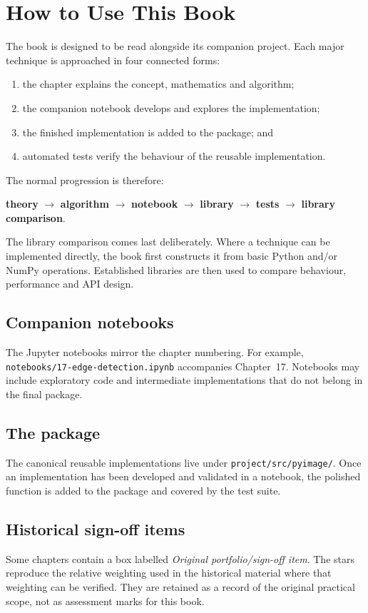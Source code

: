 \chapter*{How to Use This Book}

The book is designed to be read alongside its companion project. Each major
technique is approached in four connected forms:

\begin{enumerate}
    \item the chapter explains the concept, mathematics and algorithm;
    \item the companion notebook develops and explores the implementation;
    \item the finished implementation is added to the \pyimage{} package; and
    \item automated tests verify the behaviour of the reusable implementation.
\end{enumerate}

The normal progression is therefore:

\begin{center}
\textbf{theory} $\rightarrow$ \textbf{algorithm} $\rightarrow$
\textbf{notebook} $\rightarrow$ \textbf{library} $\rightarrow$
\textbf{tests} $\rightarrow$ \textbf{library comparison}.
\end{center}

The library comparison comes last deliberately. Where a technique can be
implemented directly, the book first constructs it from basic Python and/or
NumPy operations. Established libraries are then used to compare behaviour,
performance and API design.

\section*{Companion notebooks}

The Jupyter notebooks mirror the chapter numbering. For example,
\texttt{notebooks/17-edge-detection.ipynb} accompanies Chapter~17. Notebooks
may include exploratory code and intermediate implementations that do not
belong in the final package.

\section*{The \pyimage{} package}

The canonical reusable implementations live under
\texttt{project/src/pyimage/}. Once an implementation has been developed and
validated in a notebook, the polished function is added to the package and
covered by the test suite.

\section*{Historical sign-off items}

Some chapters contain a box labelled \emph{Original portfolio/sign-off item}.
The stars reproduce the relative weighting used in the historical material
where that weighting can be verified. They are retained as a record of the
original practical scope, not as assessment marks for this book.
